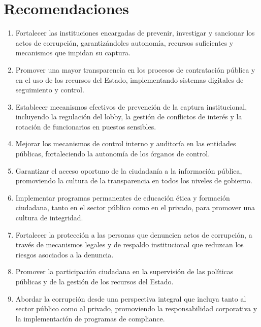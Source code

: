 \documentclass[12pt,a4paper]{article}
\begin{document}
\section{Recomendaciones}

\begin{enumerate}[label=\arabic*.]
    \item Fortalecer las instituciones encargadas de prevenir, investigar y sancionar los actos de corrupción, garantizándoles autonomía, recursos suficientes y mecanismos que impidan su captura.
    
    \item Promover una mayor transparencia en los procesos de contratación pública y en el uso de los recursos del Estado, implementando sistemas digitales de seguimiento y control.
    
    \item Establecer mecanismos efectivos de prevención de la captura institucional, incluyendo la regulación del lobby, la gestión de conflictos de interés y la rotación de funcionarios en puestos sensibles.
    
    \item Mejorar los mecanismos de control interno y auditoría en las entidades públicas, fortaleciendo la autonomía de los órganos de control.
    
    \item Garantizar el acceso oportuno de la ciudadanía a la información pública, promoviendo la cultura de la transparencia en todos los niveles de gobierno.
    
    \item Implementar programas permanentes de educación ética y formación ciudadana, tanto en el sector público como en el privado, para promover una cultura de integridad.
    
    \item Fortalecer la protección a las personas que denuncien actos de corrupción, a través de mecanismos legales y de respaldo institucional que reduzcan los riesgos asociados a la denuncia.
    
    \item Promover la participación ciudadana en la supervisión de las políticas públicas y de la gestión de los recursos del Estado.
    
    \item Abordar la corrupción desde una perspectiva integral que incluya tanto al sector público como al privado, promoviendo la responsabilidad corporativa y la implementación de programas de compliance.
\end{enumerate}
\end{document}

